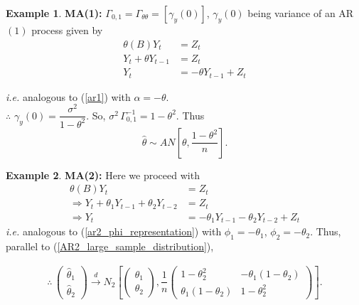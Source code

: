 \documentclass[11pt, a4paper]{article}
\numberwithin{equation}{section}
\theoremstyle{definition}
\newtheorem{example}{Example}[subsection]
\begin{document}
\vspace{0.25cm}

\begin{example}
\textbf{MA(1):} $\Gamma_{0, 1} = \Gamma_{\theta \theta} = \left[ \gamma_y (0) \right]$, $\gamma_y (0)$ being variance of an AR$(1)$ process given by 
\begin{align*}
\theta(B) Y_t &= Z_t \\[0.3em]
Y_t + \theta Y_{t-1} &= Z_t \\[0.3em]
Y_t &= - \theta Y_{t-1} + Z_t
\end{align*}

\textit{i.e.} analogous to (\ref{ar1}) with $\alpha = - \theta$. \\[0.3em]

$\therefore$ $\gamma_y (0) = \dfrac{\sigma^2}{1 - \theta^2}$. So, $\sigma^2 \, \Gamma_{0, 1}^{-1} = 1 - \theta^2$. Thus
$$\hat{\theta} \sim AN\left[ \theta, \dfrac{1-\theta^2}{n} \right].$$
\end{example}

\begin{example}
\textbf{MA(2):} Here we proceed with
\begin{align*}
\theta(B) Y_t &= Z_t \\[0.3em]
\Rightarrow Y_t + \theta_1 Y_{t-1} + \theta_2 Y_{t-2} &= Z_t \\[0.3em]
\Rightarrow Y_t &= - \theta_1 Y_{t-1} - \theta_2 Y_{t-2} + Z_t
\end{align*}
\textit{i.e.} analogous to (\ref{ar2_phi_representation}) with $\phi_1 = - \theta_1$, $\phi_2 = - \theta_2$. Thus, parallel to (\ref{AR2_large_sample_distribution}), 

\begin{align}
\therefore \, \begin{pmatrix} \hat{\theta}_1 \\[0.3em] \hat{\theta}_2 \end{pmatrix} \overset{d}{\rightarrow} N_2 \left[ \begin{pmatrix} \theta_1 \\[0.3em] \theta_2 \end{pmatrix},  \dfrac{1}{n} \begin{pmatrix}
1 - \theta_2^2 & -\theta_1 \left( 1 - \theta_2 \right) \\[0.3em] \theta_1 \left( 1 - \theta_2 \right) & 1 - \theta_2^2 \end{pmatrix} \right].
\end{align}
\end{example}
\end{document}
